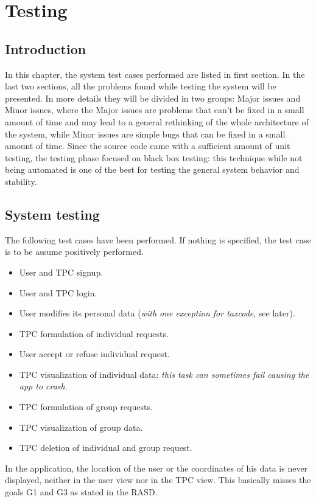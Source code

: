 \section{Testing}

\subsection{Introduction}

In this chapter, the system test cases performed are listed in first section.
In the last two sections, all the problems found while testing the system will be presented. In more details they will be divided in two groups: Major issues and Minor issues, where the Major issues are problems that can't be fixed in a small amount of time and may lead to a general rethinking of the whole architecture of the system, while Minor issues are simple bugs that can be fixed in a small amount of time.
Since the source code came with a sufficient amount of unit testing, the testing phase focused on black box testing: this technique while not being automated is one of the best for testing the general system behavior and stability.

\subsection{System testing}
The following test cases have been performed. If nothing is specified, the test case is to be assume positively performed.

\begin{itemize}
\item User and TPC signup.
\item User and TPC login.
\item User modifies its personal data (\textit{with one exception for taxcode}, see later).
\item TPC formulation of  individual requests.
\item User accept or refuse individual request.
\item TPC visualization of individual data: \textit{this task can sometimes fail causing the app to crash}.
\item TPC formulation of group requests.
\item TPC visualization of group data.
\item TPC deletion of individual and group request.
\end{itemize}


In the application, the location of the user or the coordinates of his data is never displayed, neither in the user view nor in the TPC view. This basically misses the goals G1 and G3 as stated in the RASD.

